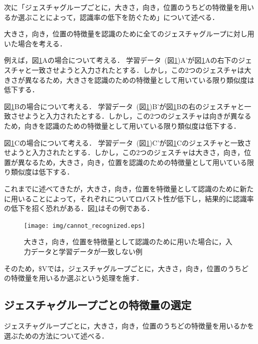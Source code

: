 次に「ジェスチャグループごとに，大きさ，向き，位置のうちどの特徴量を用いるか選ぶことによって，認識率の低下を防ぐため」について述べる．

大きさ，向き，位置の特徴量を認識のために全てのジェスチャグループに対し用いた場合を考える．

例えば，図\ref{fig:cannot_recognized}Aの場合について考える．
学習データ~(図\ref{fig:cannot_recognized})A'が図\ref{fig:cannot_recognized}Aの右下のジェスチャと一致させようと入力されたとする．しかし，この2つのジェスチャは大きさが異なるため，大きさを認識のための特徴量として用いている限り類似度は低下する．

図\ref{fig:cannot_recognized}Bの場合について考える．
学習データ~(図\ref{fig:cannot_recognized})B'が図\ref{fig:cannot_recognized}Bの右のジェスチャと一致させようと入力されたとする．しかし，この2つのジェスチャは向きが異なるため，向きを認識のための特徴量として用いている限り類似度は低下する．

図\ref{fig:cannot_recognized}Cの場合について考える．
学習データ~(図\ref{fig:cannot_recognized})C'が図\ref{fig:cannot_recognized}Cのジェスチャと一致させようと入力されたとする．しかし，この2つのジェスチャは大きさ，向き，位置が異なるため，大きさ，向き，位置を認識のための特徴量として用いている限り類似度は低下する．

これまでに述べてきたが，大きさ，向き，位置を特徴量として認識のために新たに用いることによって，それぞれについてロバスト性が低下し，結果的に認識率の低下を招く恐れがある．図\ref{fig:cannot_recognized}はその例である．

\begin{figure} [h!]
	\begin{center}
		\texttt{[image: img/cannot\_recognized.eps]}
	\end{center}
	\caption{大きさ，向き，位置を特徴量として認識のために用いた場合に，入力データと学習データが一致しない例}
	\label{fig:cannot_recognized}
\end{figure}

そのため，\$Vでは，ジェスチャグループごとに，大きさ，向き，位置のうちどの特徴量を用いるか選ぶという処理を施す．

\subsection{ジェスチャグループごとの特徴量の選定}
ジェスチャグループごとに，大きさ，向き，位置のうちどの特徴量を用いるかを選ぶための方法について述べる．





